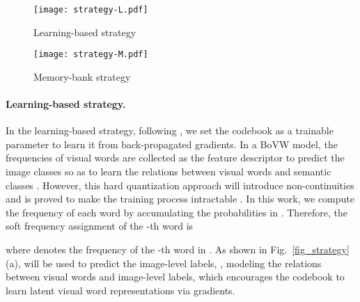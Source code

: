 \begin{figure*}
  \centering
  \begin{subfigure}[b]{0.48\textwidth}
    \centering
    \texttt{[image: strategy-L.pdf]}
    \caption{Learning-based strategy}
  \end{subfigure}
  \begin{subfigure}[b]{0.48\textwidth}
    \centering
    \texttt{[image: strategy-M.pdf]}
    \caption{Memory-bank strategy}
  \end{subfigure}

  \caption{Illustration of strategies for visual word codebook. For the learning-based strategy, we follow the original intention of BoVW models \citep{liu2019bow,gidaris2020learning}, \ie using visual word frequencies to predict the image-level labels, which could enforce to learn the codebook from the back-propagated gradients. For the memory-bank strategy, inspired by mini-batch K-means \citep{sculley2010web}, we decompose the clustering on the whole dataset to each training step and update the codebook from reconstruction in the memory-bank mechanism.}
  \label{fig_strategy}
\end{figure*}

\paragraph{\textbf{Learning-based strategy.}}
\label{strategy_l}
\par In the learning-based strategy, following \citep{passalis2017learning,arandjelovic2017netvlad}, we set the codebook as a trainable parameter to learn it from back-propagated gradients. In a BoVW model, the frequencies of visual words are collected as the feature descriptor to predict the image classes so as to learn the relations between visual words and semantic classes \citep{liu2019bow}. However, this hard quantization approach will introduce non-continuities and is proved to make the training process intractable \citep{passalis2017learning}. In this work, we compute the frequency of each word by accumulating the probabilities in . Therefore, the soft frequency assignment of the -th word is

where  denotes the frequency of the -th word in . As shown in Fig.~\ref{fig_strategy} (a),  will be used to predict the image-level labels, \ie, modeling the relations between visual words and image-level labels, which encourages the codebook to learn latent visual word representations via gradients.

